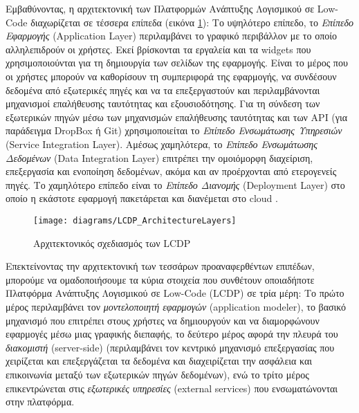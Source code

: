             Εμβαθύνοντας, η αρχιτεκτονική των Πλατφορμών Ανάπτυξης Λογισμικού σε Low-Code διαχωρίζεται σε τέσσερα επίπεδα (εικόνα \ref{fig:LCDP_ArchitectureLayers}): Το υψηλότερο επίπεδο, το \textit{Επίπεδο Εφαρμογής} (Application Layer) περιλαμβάνει το γραφικό περιβάλλον με το οποίο αλληλεπιδρούν οι χρήστες. Εκεί βρίσκονται τα εργαλεία και τα widgets που χρησιμοποιούνται για τη δημιουργία των σελίδων της εφαρμογής. Είναι το μέρος που οι χρήστες μπορούν να καθορίσουν τη συμπεριφορά της εφαρμογής, να συνδέσουν δεδομένα από εξωτερικές πηγές και να τα επεξεργαστούν και περιλαμβάνονται μηχανισμοί επαλήθευσης ταυτότητας και εξουσιοδότησης. Για τη σύνδεση των εξωτερικών πηγών μέσω των μηχανισμών επαλήθευσης ταυτότητας και των API (για παράδειγμα DropBox ή Git) χρησιμοποιείται το \textit{Επίπεδο Ενσωμάτωσης Υπηρεσιών} (Service Integration Layer). Αμέσως χαμηλότερα, το \textit{Επίπεδο Ενσωμάτωσης Δεδομένων} (Data Integration Layer) επιτρέπει την ομοιόμορφη διαχείριση, επεξεργασία και ενοποίηση δεδομένων, ακόμα και αν προέρχονται από ετερογενείς πηγές. Το χαμηλότερο επίπεδο είναι το \textit{Επίπεδο Διανομής} (Deployment Layer) στο οποίο η εκάστοτε εφαρμογή πακετάρεται και διανέμεται στο cloud \cite{Sahay2020}.

            \begin{figure}[h!] \noindent \centering
                \texttt{[image: diagrams/LCDP\_ArchitectureLayers]}
                \caption{Αρχιτεκτονικός σχεδιασμός των LCDP \cite{Sahay2020}}
                \label{fig:LCDP_ArchitectureLayers}
            \end{figure}

            Επεκτείνοντας την αρχιτεκτονική των τεσσάρων προαναφερθέντων επιπέδων, μπορούμε να ομαδοποιήσουμε τα κύρια στοιχεία που συνθέτουν οποιαδήποτε Πλατφόρμα Ανάπτυξης Λογισμικού σε Low-Code (LCDP) σε τρία μέρη: Το πρώτο μέρος περιλαμβάνει τον \textit{μοντελοποιητή εφαρμογών} (application modeler), το βασικό μηχανισμό που επιτρέπει στους χρήστες να δημιουργούν και να διαμορφώνουν εφαρμογές μέσω μιας γραφικής διεπαφής, το δεύτερο μέρος αφορά την πλευρά του \textit{διακομιστή} (server-side) (περιλαμβάνει τον κεντρικό μηχανισμό επεξεργασίας που χειρίζεται και επεξεργάζεται τα δεδομένα και διαχειρίζεται την ασφάλεια και επικοινωνία μεταξύ των εξωτερικών πηγών δεδομένων), ενώ το τρίτο μέρος επικεντρώνεται στις \textit{εξωτερικές υπηρεσίες} (external services) που ενσωματώνονται στην πλατφόρμα.

